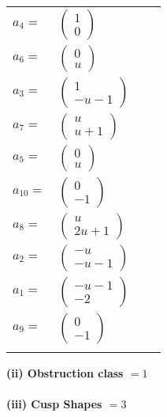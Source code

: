 \documentclass[1p]{elsarticle_modified}
\theoremstyle{definition}
\begin{document}
\begin{tabular}{m{7pt} m{180pt} m{7pt} m{180pt} }
\flushright $a_{4}=$&$\begin{pmatrix}1\\0\end{pmatrix}$ \\
\flushright $a_{6}=$&$\begin{pmatrix}0\\u\end{pmatrix}$ \\
\flushright $a_{3}=$&$\begin{pmatrix}1\\- u-1\end{pmatrix}$ \\
\flushright $a_{7}=$&$\begin{pmatrix}u\\u+1\end{pmatrix}$ \\
\flushright $a_{5}=$&$\begin{pmatrix}0\\u\end{pmatrix}$ \\
\flushright $a_{10}=$&$\begin{pmatrix}0\\-1\end{pmatrix}$ \\
\flushright $a_{8}=$&$\begin{pmatrix}u\\2 u+1\end{pmatrix}$ \\
\flushright $a_{2}=$&$\begin{pmatrix}- u\\- u-1\end{pmatrix}$ \\
\flushright $a_{1}=$&$\begin{pmatrix}- u-1\\-2\end{pmatrix}$ \\
\flushright $a_{9}=$&$\begin{pmatrix}0\\-1\end{pmatrix}$\\&\end{tabular}
\flushleft \textbf{(ii) Obstruction class $= 1$}\\~\\
\flushleft \textbf{(iii) Cusp Shapes $= 3$}\\~\\
\end{document}
